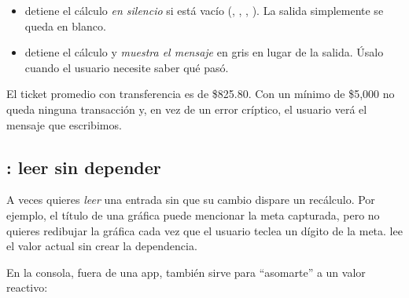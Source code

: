 \begin{itemize}
  \item {} detiene el cálculo \emph{en silencio} si 
        está vacío (, , ,
        ). La salida simplemente se queda en blanco.
  \item {} detiene el cálculo y
        \emph{muestra el mensaje} en gris en lugar de la salida. Úsalo cuando
        el usuario necesite saber qué pasó.
\end{itemize}


El ticket promedio con transferencia es de \$825.80. Con un mínimo de
\$5,000 no queda ninguna transacción y, en vez de un error críptico, el
usuario verá el mensaje que escribimos.

\subsection{\texorpdfstring{}{isolate()}: leer sin depender}

A veces quieres \emph{leer} una entrada sin que su cambio dispare un
recálculo. Por ejemplo, el título de una gráfica puede mencionar la meta
capturada, pero no quieres redibujar la gráfica cada vez que el usuario
teclea un dígito de la meta.  lee el valor
actual sin crear la dependencia.

En la consola, fuera de una app,  también sirve para
``asomarte'' a un valor reactivo:

